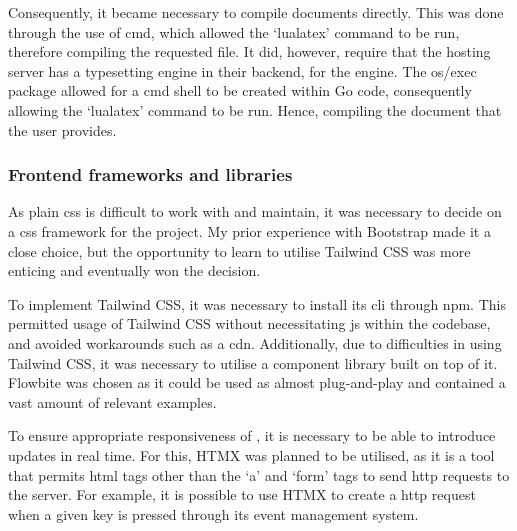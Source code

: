 Consequently, it became necessary to compile \latexspaced documents directly. This was done through the use of \acrfull{cmd}, which allowed the `lualatex' command to be run, therefore compiling the requested file. It did, however, require that the hosting server has a \texspaced typesetting engine in their backend, for the \lualatexspaced engine. The os/exec \parencite{os-exec} package allowed for a \acrshort{cmd} shell to be created within Go code, consequently allowing the `lualatex' command to be run. Hence, compiling the \latexspaced document that the user provides.

\subsubsection{Frontend frameworks and libraries}
As plain \acrfull{css} is difficult to work with and maintain, it was necessary to decide on a \acrshort{css} framework for the project. My prior experience with Bootstrap \parencite{bootstrap} made it a close choice, but the opportunity to learn to utilise Tailwind CSS \parencite{tailwind} was more enticing and eventually won the decision.

To implement Tailwind CSS, it was necessary to install its \acrfull{cli} through \acrfull{npm}. This permitted usage of Tailwind CSS without necessitating \acrfull{js} within the codebase, and avoided workarounds such as a \acrfull{cdn}. Additionally, due to difficulties in using Tailwind CSS, it was necessary to utilise a component library built on top of it. Flowbite \parencite{flowbite} was chosen as it could be used as almost plug-and-play and contained a vast amount of relevant examples.

To ensure appropriate responsiveness of \lintex, it is necessary to be able to introduce updates in real time. For this, HTMX \parencite{htmx} was planned to be utilised, as it is a tool that permits \acrshort{html} tags other than the `a' and `form' tags to send \acrfull{http} requests to the server. For example, it is possible to use HTMX to create a \acrshort{http} request when a given key is pressed through its event management system.

